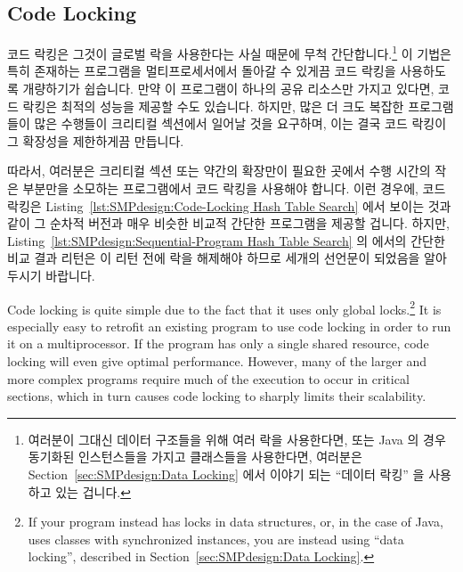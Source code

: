 
\subsection{Code Locking}
\label{sec:SMPdesign:Code Locking}

코드 락킹은 그것이 글로벌 락을 사용한다는 사실 때문에 무척
간단합니다.\footnote{
	여러분이 그대신 데이터 구조들을 위해 여러 락을 사용한다면, 또는 Java 의
	경우 동기화된 인스턴스들을 가지고 클래스들을 사용한다면, 여러분은
	Section~\ref{sec:SMPdesign:Data Locking} 에서 이야기 되는 ``데이터
	락킹'' 을 사용하고 있는 겁니다.}
이 기법은 특히 존재하는 프로그램을 멀티프로세서에서 돌아갈 수 있게끔 코드
락킹을 사용하도록 개량하기가 쉽습니다.  만약 이 프로그램이 하나의 공유 리소스만
가지고 있다면, 코드 락킹은 최적의 성능을 제공할 수도 있습니다.
하지만, 많은 더 크도 복잡한 프로그램들이 많은 수행들이 크리티컬 섹션에서 일어날
것을 요구하며, 이는 결국 코드 락킹이 그 확장성을 제한하게끔 만듭니다.

따라서, 여러분은 크리티컬 섹션 또는 약간의 확장만이 필요한 곳에서 수행 시간의
작은 부분만을 소모하는 프로그램에서 코드 락킹을 사용해야 합니다.
이런 경우에, 코드 락킹은
Listing~\ref{lst:SMPdesign:Code-Locking Hash Table Search}
에서 보이는 것과 같이 그 순차적 버전과 매우 비슷한 비교적 간단한 프로그램을
제공할 겁니다.
하지만,
Listing~\ref{lst:SMPdesign:Sequential-Program Hash Table Search}
의  에서의 간단한 비교 결과 리턴은 이 리턴 전에 락을 해제해야
하므로 세개의 선언문이 되었음을 알아 두시기 바랍니다.

\iffalse

Code locking is quite simple due to the fact that it uses only
global locks.\footnote{
	If your program instead has locks in data structures,
	or, in the case of Java, uses classes with synchronized
	instances, you are instead using ``data locking'', described
	in Section~\ref{sec:SMPdesign:Data Locking}.}
It is especially
easy to retrofit an existing program to use code locking in
order to run it on a multiprocessor.  If the program has
only a single shared resource, code locking will even give
optimal performance.
However, many of the larger and more complex programs
require much of the execution to
occur in critical sections, which in turn causes code locking
to sharply limits their scalability.

